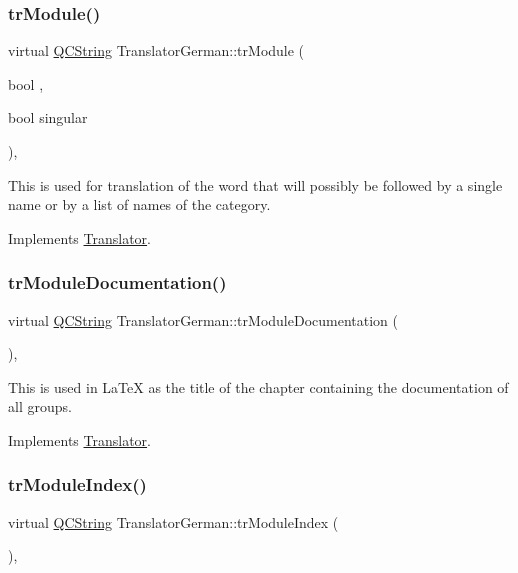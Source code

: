 \subsubsection{\texorpdfstring{trModule()}{trModule()}}
{\footnotesize\ttfamily virtual \mbox{\hyperlink{class_q_c_string}{Q\+C\+String}} Translator\+German\+::tr\+Module (\begin{DoxyParamCaption}\item[{bool}]{,  }\item[{bool}]{singular }\end{DoxyParamCaption})\hspace{0.3cm}{\ttfamily [inline]}, {\ttfamily [virtual]}}

This is used for translation of the word that will possibly be followed by a single name or by a list of names of the category. 

Implements \mbox{\hyperlink{class_translator}{Translator}}.

\mbox{\label{class_translator_german_a367f86f9281f5510fa82121d2e82a920}} 
\subsubsection{\texorpdfstring{trModuleDocumentation()}{trModuleDocumentation()}}
{\footnotesize\ttfamily virtual \mbox{\hyperlink{class_q_c_string}{Q\+C\+String}} Translator\+German\+::tr\+Module\+Documentation (\begin{DoxyParamCaption}{ }\end{DoxyParamCaption})\hspace{0.3cm}{\ttfamily [inline]}, {\ttfamily [virtual]}}

This is used in La\+TeX as the title of the chapter containing the documentation of all groups. 

Implements \mbox{\hyperlink{class_translator}{Translator}}.

\mbox{\label{class_translator_german_a071420a6095aaf56dc75572884d0df18}} 
\subsubsection{\texorpdfstring{trModuleIndex()}{trModuleIndex()}}
{\footnotesize\ttfamily virtual \mbox{\hyperlink{class_q_c_string}{Q\+C\+String}} Translator\+German\+::tr\+Module\+Index (\begin{DoxyParamCaption}{ }\end{DoxyParamCaption})\hspace{0.3cm}{\ttfamily [inline]}, {\ttfamily [virtual]}}

